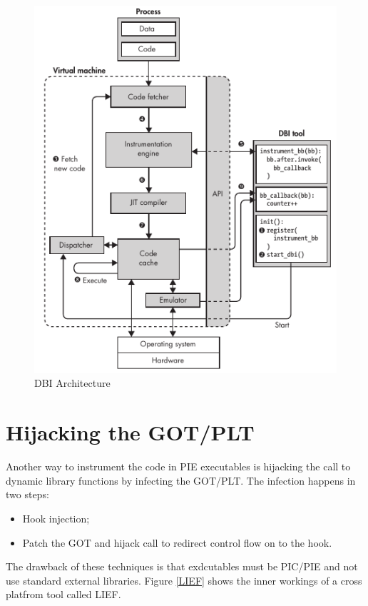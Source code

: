 \begin{figure}[bpth]
    \begin{center}
        \includegraphics[scale=0.7]{./pics/DBI.png}
        \caption{DBI Architecture}
        \label{DBI}
    \end{center}
\end{figure}



\section{Hijacking the GOT/PLT}
Another way to instrument the code in PIE executables is hijacking the call to dynamic library functions by infecting
the GOT/PLT. The infection happens in two steps:
\begin{itemize}
    \item Hook injection;
    \item Patch the {\ttfamily GOT} and hijack call to redirect control flow on to the hook.
\end{itemize}
The drawback of these techniques is that exdcutables must be {\ttfamily PIC/PIE} and not use standard external
libraries. Figure \ref{LIEF} shows the inner workings of a cross platfrom tool called LIEF.

